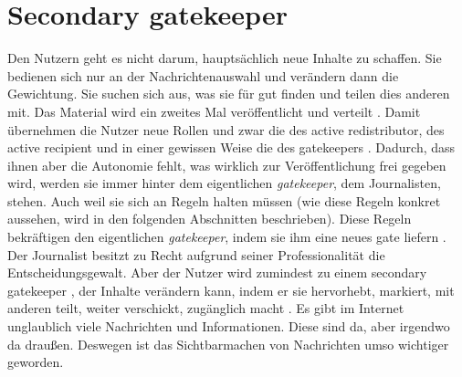 \section{Secondary gatekeeper} \label{sec:secondary-gate}
Den Nutzern geht es nicht darum, hauptsächlich neue Inhalte zu schaffen. Sie
bedienen sich nur an der Nachrichtenauswahl und verändern dann die Gewichtung.
Sie suchen sich aus, was sie für gut finden und teilen dies anderen mit. Das
Material wird ein zweites Mal veröffentlicht und verteilt
\autocite[S.~66]{singer:2014}. Damit übernehmen die Nutzer neue Rollen und zwar
die des \glqq active redistributor\grqq, des \glqq active recipient\grqq\- und in einer gewissen
Weise die des \glqq gatekeepers\grqq\- \autocite[S.~57]{singer:2014}. Dadurch, dass ihnen
aber die Autonomie fehlt, was wirklich zur Veröffentlichung frei gegeben wird,
werden sie immer hinter dem eigentlichen \emph{gatekeeper}, dem Journalisten,
stehen. Auch weil sie sich an Regeln halten müssen (wie diese Regeln konkret
aussehen, wird in den folgenden Abschnitten beschrieben). Diese Regeln
bekräftigen den eigentlichen \emph{gatekeeper}, indem sie ihm eine neues \glqq gate\grqq\-
liefern \autocite[S.~13]{santana:2014}.\\
Der Journalist besitzt zu Recht aufgrund seiner Professionalität die
Entscheidungsgewalt. Aber der Nutzer wird zumindest zu einem \glqq secondary
gatekeeper\grqq\- \autocite[S.~5]{santana:2014}, der Inhalte verändern kann, indem er
sie hervorhebt, markiert, mit anderen teilt, weiter verschickt, zugänglich macht
\autocite[S.~57]{singer:2014}.
Es gibt im Internet unglaublich viele Nachrichten und Informationen. Diese sind
da, aber irgendwo \glqq da draußen\grqq. Deswegen ist das \glqq
Sichtbarmachen\grqq\- von Nachrichten umso wichtiger geworden.


